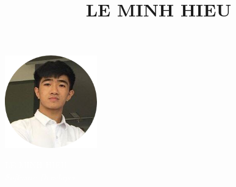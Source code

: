 \documentclass[10pt,oneside,a4paper]{article}
\title{LE MINH HIEU}
\date{}
\begin{document}

\begin{tcolorbox}
    \begin{minipage}{4.5cm}
        \hspace*{-0.3cm}\includegraphics[width=4cm]{profile-modified.png}
    \end{minipage}
    \begin{minipage}{15cm}
        \begin{center}
            \Huge{\textcolor{white}{LE MINH HIEU}} \\
            \vspace*{0.5cm}
            \Large{\textcolor{white}{\textit{Software Developer}}}
        \end{center}
    \end{minipage}
\end{tcolorbox}
\end{document}
